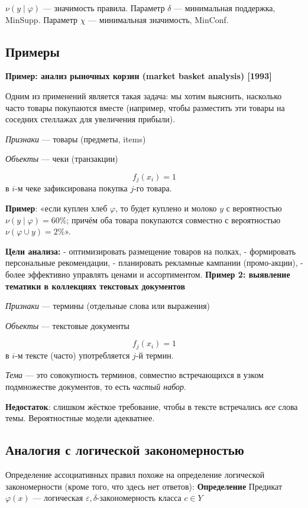 $\nu(y \mid \varphi)$ — значимость правила.
Параметр $\delta$ — минимальная поддержка, MinSupp.
Параметр $\chi$ — минимальная значимость, MinConf.

\subsection{Примеры}
\textbf{Пример: анализ рыночных корзин (market basket analysis) [1993]}

Одним из применений является такая задача: мы хотим выяснить, насколько часто товары покупаются вместе (например, чтобы разместить эти товары на соседних стеллажах для увеличения прибыли).

\textit{Признаки} — товары (предметы, items)

\textit{Объекты} — чеки (транзакции)

\[ f_j(x_i) = 1 \] 
в \( i \)-м чеке зафиксирована покупка \( j \)-го товара.

\textbf{Пример}: «если куплен хлеб \(\varphi\), то будет куплено и молоко \(y\) с вероятностью \(\nu(y \mid \varphi) = 60\%\); причём оба товара покупаются совместно с вероятностью \(\nu(\varphi \cup y) = 2\%\)».

\textbf{Цели анализа:}
- оптимизировать размещение товаров на полках,
- формировать персональные рекомендации,
- планировать рекламные кампании (промо-акции),
- более эффективно управлять ценами и ассортиментом.
\newline
\newline
\textbf{Пример 2: выявление тематики в коллекциях текстовых документов}

\textit{Признаки} — термины (отдельные слова или выражения)

\textit{Объекты} — текстовые документы

\[ f_j(x_i) = 1 \]
в \( i \)-м тексте (часто) употребляется \( j \)-й термин.

\textit{Тема} — это совокупность терминов, совместно встречающихся в узком подмножестве документов, то есть \textit{частый набор}.

\textbf{Недостаток}: слишком жёсткое требование, чтобы в тексте встречались \textit{все} слова темы. Вероятностные модели адекватнее.

\subsection{Аналогия с логической закономерностью}
Определение ассоциативных правил похоже на определение логической закономерности (кроме того, что здесь нет ответов):
\newline
\textbf{Определение}
\newline
Предикат \(\varphi(x)\) — логическая \(\varepsilon, \delta\)-закономерность класса \(c \in Y\)

